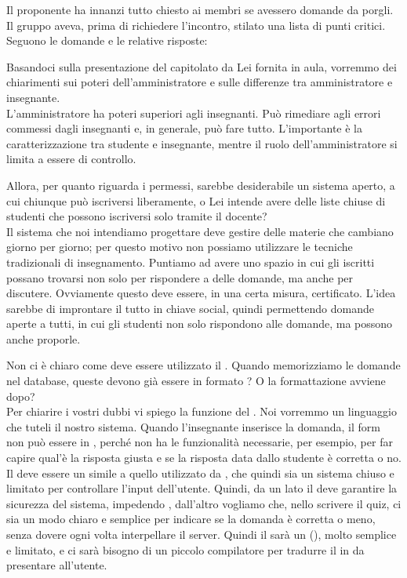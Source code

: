 \documentclass[a4paper]{article}
\begin{document}

Il proponente ha innanzi tutto chiesto ai membri se avessero domande da porgli. Il gruppo aveva, prima di richiedere l'incontro, stilato una lista di punti critici. Seguono le domande e le relative risposte: 

 Basandoci sulla presentazione del capitolato da Lei fornita in aula, vorremmo dei chiarimenti sui poteri dell'amministratore e sulle differenze tra amministratore e insegnante.
\\  L'amministratore ha poteri superiori agli insegnanti. Può rimediare agli errori commessi dagli insegnanti e, in generale, può fare tutto. L'importante è la caratterizzazione tra studente e insegnante, mentre il ruolo dell'amministratore si limita a essere di controllo.

 Allora, per quanto riguarda i permessi, sarebbe desiderabile un sistema aperto, a cui chiunque può iscriversi liberamente, o Lei intende avere delle liste chiuse di studenti che possono iscriversi solo tramite il docente?
\\  Il sistema che noi intendiamo progettare deve gestire delle materie che cambiano giorno per giorno; per questo motivo non possiamo utilizzare le tecniche tradizionali di insegnamento. Puntiamo ad avere uno spazio in cui gli iscritti possano trovarsi non solo per rispondere a delle domande, ma anche per discutere. Ovviamente questo deve essere, in una certa misura, certificato. L'idea sarebbe di improntare il tutto in chiave social, quindi permettendo domande aperte a tutti, in cui gli studenti non solo rispondono alle domande, ma possono anche proporle.

 Non ci è chiaro come deve essere utilizzato il . Quando memorizziamo le domande nel database, queste devono già essere in formato ? O la formattazione avviene dopo?
\\  Per chiarire i vostri dubbi vi spiego la funzione del . Noi vorremmo un linguaggio che tuteli il nostro sistema. Quando l'insegnante inserisce la domanda, il form non può essere in , perché  non ha le funzionalità necessarie, per esempio, per far capire qual'è la risposta giusta e se la risposta data dallo studente è corretta o no.
\newline Il  deve essere un  simile a quello utilizzato da , che quindi sia un sistema chiuso e limitato per controllare l'input dell'utente.
Quindi, da un lato il  deve garantire la sicurezza del sistema, impedendo , dall'altro vogliamo che, nello scrivere il quiz, ci sia un modo chiaro e semplice per indicare se la domanda è corretta o meno, senza dovere ogni volta interpellare il server.
Quindi il  sarà un  (), molto semplice e limitato, e ci sarà bisogno di un piccolo compilatore per tradurre il  in  da presentare all'utente.
\end{document}
